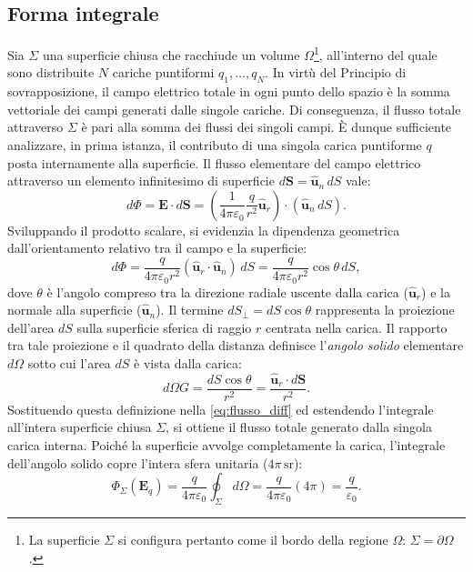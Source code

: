 \documentclass[a4paper,11pt]{report}
\begin{document}
\subsection{Forma integrale}
Sia $\Sigma$ una superficie chiusa che racchiude un volume $\Omega$\footnote{La superficie $\Sigma$ si configura pertanto come il bordo della regione $\Omega$: $\Sigma = \partial \Omega$.}, all'interno del quale sono distribuite $N$ cariche puntiformi $q_1, \dots, q_N$.
In virtù del {Principio di sovrapposizione}, il campo elettrico totale in ogni punto dello spazio è la somma vettoriale dei campi generati dalle singole cariche. Di conseguenza, il flusso totale attraverso $\Sigma$ è pari alla somma dei flussi dei singoli campi.
È dunque sufficiente analizzare, in prima istanza, il contributo di una singola carica puntiforme $q$ posta internamente alla superficie.
Il flusso elementare del campo elettrico attraverso un elemento infinitesimo di superficie $d\bm{S} = \hat{\bm{u}}_n \, dS$ vale:
\begin{equation}
    d\Phi = \bm{E} \cdot d\bm{S} = \left( \frac{1}{4\pi \varepsilon_0} \frac{q}{r^2} \hat{\bm{u}}_r \right) \cdot (\hat{\bm{u}}_n \, dS).
\end{equation}
Sviluppando il prodotto scalare, si evidenzia la dipendenza geometrica dall'orientamento relativo tra il campo e la superficie:
\begin{equation}
    d\Phi = \frac{q}{4\pi \varepsilon_0 r^2} (\hat{\bm{u}}_r \cdot \hat{\bm{u}}_n) \, dS = \frac{q}{4\pi \varepsilon_0 r^2} \cos\theta \, dS,
    \label{eq:flusso_diff}
\end{equation}
dove $\theta$ è l'angolo compreso tra la direzione radiale uscente dalla carica ($\hat{\bm{u}}_r$) e la normale alla superficie ($\hat{\bm{u}}_n$).
Il termine $dS_{\perp} = dS \cos\theta$ rappresenta la proiezione dell'area $dS$ sulla superficie sferica di raggio $r$ centrata nella carica. Il rapporto tra tale proiezione e il quadrato della distanza definisce l'\textit{angolo solido} elementare $d\Omega$ sotto cui l'area $dS$ è vista dalla carica:
\begin{equation}
   d\Omega{G} = \frac{dS \cos\theta}{r^2} = \frac{\hat{\bm{u}}_r \cdot d\bm{S}}{r^2}.
\end{equation}
Sostituendo questa definizione nella \eqref{eq:flusso_diff} ed estendendo l'integrale all'intera superficie chiusa $\Sigma$, si ottiene il flusso totale generato dalla singola carica interna. Poiché la superficie avvolge completamente la carica, l'integrale dell'angolo solido copre l'intera sfera unitaria ($4\pi \, \si{\steradian}$):
\begin{equation}
    \Phi_{\Sigma}(\bm{E}_q) = \frac{q}{4\pi \varepsilon_0} \oint_{\Sigma} d\Omega= \frac{q}{4\pi \varepsilon_0} (4\pi) = \frac{q}{\varepsilon_0}.
\end{equation}
\end{document}
